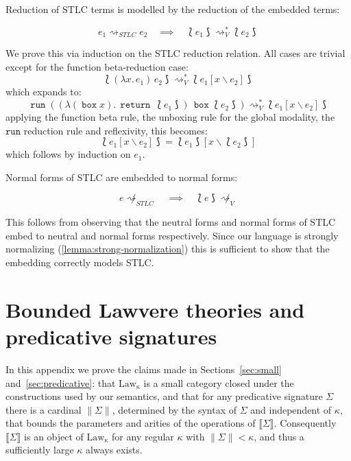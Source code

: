 \documentclass[acmsmall, screen, review, anonymous]{acmart}
\theoremstyle{definition}
\newcommand{\lawc}{\mathrm{Law_{\kappa}}}
\newcommand{\sem}[1]{\llbracket #1 \rrbracket}
\newcommand{\card}[1]{\|#1\|}
\newcommand{\abs}[2]{\lambda#1.\,#2}
\newcommand{\app}[2]{#1\,#2}
\newcommand{\returnname}{\mathop{\mathtt{return}}}
\newcommand{\return}[1]{\returnname\, #1}
\newcommand{\gboxname}{\mathop{\mathtt{box}}}
\newcommand{\gbox}[1]{\gboxname #1}
\newcommand{\grunname}{\mathtt{run}}
\newcommand{\grun}[1]{\mathop{\grunname}(#1)}
\newcommand{\sub}[2]{[#1\backslash#2]}
\newcommand{\sbst}[3]{#1\sub{#2}{#3}}
\newcommand{\stepstoname}{\rightsquigarrow}
\newcommand{\stepstostlc}{\stepstoname_{STLC}}
\newcommand{\stepsnotv}{\not\stepstoname_{V}}
\newcommand{\stepsnotstlc}{\not\stepstoname_{STLC}}
\newcommand{\reducestoname}{\stepstoname^{*}}
\newcommand{\reducestov}{\reducestoname_{V}}
\newcommand{\embed}[1]{\mathopen{\lbag}#1\mathclose{\rbag}}
\begin{document}
Reduction of STLC terms is modelled by the reduction of the embedded
terms:
\begin{lemma}
\label{lemma:stlc-reduces}
  \begin{equation*}
    e_1 \stepstostlc e_2
    \quad \implies \quad \embed{e_1} \reducestov \embed{e_2}
  \end{equation*}
\end{lemma}
We prove this via induction on the STLC reduction relation. All cases
are trivial except for the function beta-reduction case:
\begin{equation*}
  \embed{\app{(\abs{x}{e_1})}{e_2}} \reducestov \embed{\sbst{e_1}{x}{e_2}}
\end{equation*}
which expands to:
\begin{equation*}
\grun{\app{(\abs{(\gbox{x})}{\return{\embed{e_1}}})}{\gbox{\embed{e_2}}}}  \reducestov \embed{\sbst{e_1}{x}{e_2}}
\end{equation*}
applying the function beta rule, the unboxing rule for the global
modality, the $\grunname$ reduction rule and reflexivity, this becomes:
\begin{equation*}
\embed{\sbst{e_1}{x}{e_2}} = \sbst{\embed{e_1}}{x}{\embed{e_2}}
\end{equation*}
which follows by induction on $e_1$.

Normal forms of STLC are embedded to normal forms:
\begin{lemma}
\label{lemma:normal}
  \begin{equation*}
    e \stepsnotstlc
    \quad \implies \quad \embed{e} \stepsnotv
  \end{equation*}
\end{lemma}
This follows from observing that the neutral forms and normal forms of
STLC embed to neutral and normal forms respectively. Since our language
is strongly normalizing (\ref{lemma:strong-normalization}) this is
sufficient to show that the embedding correctly models STLC.

\section{Bounded Lawvere theories and predicative signatures}
\label{apdx:bounds}

In this appendix we prove the claims made in Sections~\ref{sec:small}
and~\ref{sec:predicative}: that $\lawc$ is a small category closed under
the constructions used by our semantics, and that for any predicative
signature $\Sigma$ there is a cardinal $\card{\Sigma}$, determined by
the syntax of $\Sigma$ and independent of $\kappa$, that bounds the
parameters and arities of the operations of $\sem{\Sigma}$. Consequently
$\sem{\Sigma}$ is an object of $\lawc$ for any regular $\kappa$ with
$\card{\Sigma} < \kappa$, and thus a sufficiently large $\kappa$ always
exists.
\end{document}
